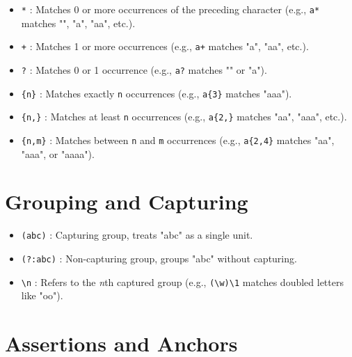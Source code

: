 \begin{itemize}

    \item \texttt{*} : Matches 0 or more occurrences of the preceding character (e.g., \texttt{a*} matches "", "a", "aa", etc.).

    \item \texttt{+} : Matches 1 or more occurrences (e.g., \texttt{a+} matches "a", "aa", etc.).

    \item \texttt{?} : Matches 0 or 1 occurrence (e.g., \texttt{a?} matches "" or "a").

    \item \texttt{\{n\}} : Matches exactly \texttt{n} occurrences (e.g., \texttt{a\{3\}} matches "aaa").

    \item \texttt{\{n,\}} : Matches at least \texttt{n} occurrences (e.g., \texttt{a\{2,\}} matches "aa", "aaa", etc.).

    \item \texttt{\{n,m\}} : Matches between \texttt{n} and \texttt{m} occurrences (e.g., \texttt{a\{2,4\}} matches "aa", "aaa", or "aaaa").

\end{itemize}

\section{Grouping and Capturing}

\begin{itemize}

    \item \texttt{(abc)} : Capturing group, treats "abc" as a single unit.

    \item \texttt{(?:abc)} : Non-capturing group, groups "abc" without capturing.

    \item \texttt{\textbackslash n} : Refers to the \emph{n}th captured group (e.g., \texttt{(\textbackslash w)\textbackslash 1} matches doubled letters like "oo").

\end{itemize}

\section{Assertions and Anchors}

